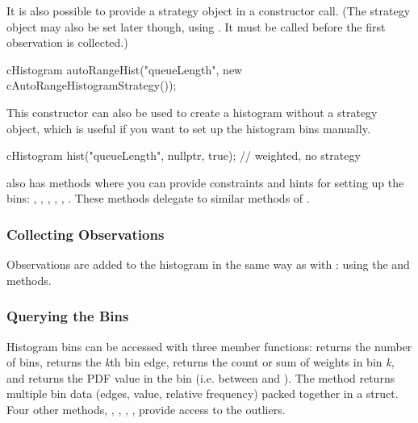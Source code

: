 It is also possible to provide a strategy object in a constructor call.
(The strategy object may also be set later though, using .
It must be called before the first observation is collected.)

\begin{cpp}
cHistogram autoRangeHist("queueLength", new cAutoRangeHistogramStrategy());
\end{cpp}

This constructor can also be used to create a histogram without a strategy
object, which is useful if you want to set up the histogram bins manually.

\begin{cpp}
cHistogram hist("queueLength", nullptr, true); // weighted, no strategy
\end{cpp}

 also has methods where you can provide constraints
and hints for setting up the bins: , ,
, ,
, . These methods
delegate to similar methods of .


\subsubsection{Collecting Observations}
\label{sec:sim-lib:collecting-observations}

Observations are added to the histogram in the same way as with :
using the  and  methods.

\subsubsection{Querying the Bins}
\label{sec:sim-lib:querying-bins}

Histogram bins can be accessed with three member functions:
 returns the number of bins,
 returns the \textit{k}th bin edge,
 returns the count or sum of weights in bin \textit{k},
and  returns the PDF value in the bin
(i.e. between  and ).
The  method returns multiple bin data
(edges, value, relative frequency) packed together in a struct.
Four other methods, , ,
, , provide access to
the outliers.

